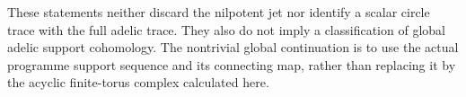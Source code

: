 These statements neither discard the nilpotent jet nor identify a scalar
circle trace with the full adelic trace. They also do not imply a
classification of global adelic support cohomology. The nontrivial
global continuation is to use the actual programme support sequence and
its connecting map, rather than replacing it by the acyclic finite-torus
complex calculated here.
